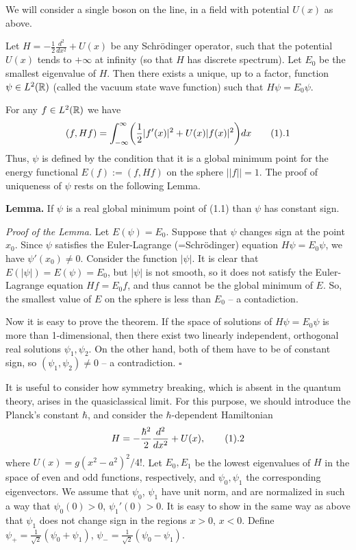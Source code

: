 We will consider a single boson on the line, 
in a field with potential $U(x)$ as above. 

 Let $H=-\frac{1}{2}\frac{d^2}{d x^2}+U(x)$ be any
Schr\"odinger operator, such that the potential $U(x)$ tends to $+\infty$ 
at infinity (so that $H$ has discrete spectrum). Let $E_0$ be the smallest
eigenvalue of $H$. Then there exists a unique, up to a factor,
function $\psi\in L^2(\Bbb R)$
(called the vacuum state wave function) such that $H\psi=E_0\psi$. 
\endproclaim

 For any $f\in L^2(\Bbb R)$ we have
$$
(f,Hf)=\int_{-\infty}^{\infty}\biggl(\frac{1}{2}|f'(x)|^2+U(x)|f(x)|^2\biggr)dx
\tag 1.1
$$
Thus, $\psi$ is defined by the condition that it is a global minimum point
for the energy functional $E(f):=(f,Hf)$ on the sphere $||f||=1$. 
The proof of uniqueness of $\psi$ rests 
on the following Lemma. 

{\bf Lemma.} If $\psi$ is a real global minimum point of (1.1) 
than $\psi$ has constant sign. 

{\it Proof of the Lemma.} Let $E(\psi)=E_0$. 
Suppose that $\psi$ changes sign at the point $x_0$. 
Since $\psi$ satisfies the Euler-Lagrange (=Schr\"odinger) 
equation $H\psi=E_0\psi$, we have
$\psi'(x_0)\ne 0$. Consider the function $|\psi|$. It is clear that
$E(|\psi|)=E(\psi)=E_0$, but $|\psi|$ is not smooth, so it does not satisfy 
the Euler-Lagrange equation $Hf=E_0f$, and thus cannot be the global minimum 
of $E$. So, the smallest value of $E$ on the sphere is less than $E_0$
-- a contadiction. 

Now it is easy to prove the theorem. If the space of solutions of 
$H\psi=E_0\psi$ is more than 1-dimensional, then there exist 
two linearly independent, orthogonal 
real solutions $\psi_1,\psi_2$. On the other hand, both of them
have to be of constant sign, so $(\psi_1,\psi_2)\ne 0$ -- a contradiction. 
$\square$\enddemo

It is useful to consider how symmetry breaking, which is absent in the quantum 
theory, arises in the quasiclassical limit. For this purpose, we should
introduce the Planck's constant $\hbar$, and consider the $\hbar$-dependent 
Hamiltonian
$$
H=-\frac{\hbar^2}{2}\frac{d^2}{d x^2}+U(x),\tag 1.2
$$
where $U(x)=g(x^2-a^2)^2/4!$. 
Let $E_0,E_1$ be the lowest eigenvalues of $H$ in the space of even and 
odd functions, respectively, and $\psi_0,\psi_1$ the corresponding 
eigenvectors. We assume that 
$\psi_0$, $\psi_1$ have unit norm, and are normalized in such a way
that $\psi_0(0)>0$, $\psi_1'(0)>0$. It is easy to show in the same way as above
that $\psi_1$ does not change sign in the regions 
$x>0$, $x<0$. 
Define
$\psi_+=\frac{1}{\sqrt{2}}(\psi_0+\psi_1)$,
$\psi_-=\frac{1}{\sqrt{2}}(\psi_0-\psi_1)$.

